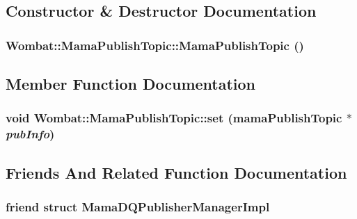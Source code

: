 \subsection{Constructor \& Destructor Documentation}
\hypertarget{classWombat_1_1MamaPublishTopic_afb52e7ebddc6df6d2d03034ac8f86042}{
\subsubsection[{MamaPublishTopic}]{\setlength{\rightskip}{0pt plus 5cm}Wombat::MamaPublishTopic::MamaPublishTopic ()}}
\label{classWombat_1_1MamaPublishTopic_afb52e7ebddc6df6d2d03034ac8f86042}


\subsection{Member Function Documentation}
\hypertarget{classWombat_1_1MamaPublishTopic_aa56db7eac64cd99b6a3d93508e2c4edc}{
\subsubsection[{set}]{\setlength{\rightskip}{0pt plus 5cm}void Wombat::MamaPublishTopic::set (mamaPublishTopic $\ast$ {\em pubInfo})}}
\label{classWombat_1_1MamaPublishTopic_aa56db7eac64cd99b6a3d93508e2c4edc}


\subsection{Friends And Related Function Documentation}
\hypertarget{classWombat_1_1MamaPublishTopic_af0b94f777c7ff99519ee9a69876f52eb}{
\subsubsection[{MamaDQPublisherManagerImpl}]{\setlength{\rightskip}{0pt plus 5cm}friend struct MamaDQPublisherManagerImpl}}
\label{classWombat_1_1MamaPublishTopic_af0b94f777c7ff99519ee9a69876f52eb}


